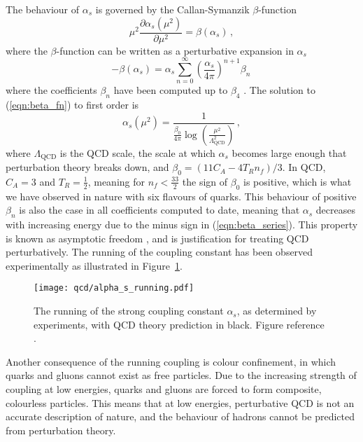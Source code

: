 \documentclass[main.tex]{subfiles}
\begin{document}
    The behaviour of $\alpha_{s}$
    is governed by the Callan-Symanzik \cite{Callan:1970yg,Symanzik:1970rt}
    $\beta$-function
    \begin{equation}\label{eqn:beta_fn}
        \mu^{2} \dfrac{\partial \alpha_{s}(\mu^{2})}{\partial \mu^{2}} = \beta(\alpha_{s}) \, ,
    \end{equation}
    where the $\beta$-function can be written as a perturbative
    expansion in $\alpha_{s}$
    \begin{equation}\label{eqn:beta_series}
        -\beta(\alpha_{s}) = \alpha_{s}\sum_{n=0}^{\infty}\left(\dfrac{\alpha_{s}}{4\pi}\right)^{n+1} \beta_{n}\, 
    \end{equation}
    where the coefficients $\beta_{n}$ have been computed
    up to $\beta_{4}$ \cite{Baikov:2016tgj,Luthe:2017ttg}.
    The solution to (\ref{eqn:beta_fn}) to first order
    is
    \begin{equation}\label{eqn:1l_alpha}
        \alpha_{s}(\mu^{2}) = \dfrac{1}{\frac{\beta_{0}}{4\pi}\log\left(\frac{\mu^{2}}{\Lambda_{\mathrm{QCD}}^{2}}\right)} \, ,
    \end{equation}
    where $\Lambda_{\mathrm{QCD}}$ is the QCD scale,
    the scale at which $\alpha_{s}$ becomes
    large enough that perturbation theory breaks down,
    and $\beta_{0} = (11C_{A} - 4T_{R}n_{f})/3$.
    In QCD, $C_{A}=3$ and $T_{R}=\frac{1}{2}$, meaning for
    $n_{f} < \frac{33}{2}$ the sign of $\beta_{0}$ is positive,
    which is what we have observed in nature with six
    flavours of quarks. This behaviour of positive
    $\beta_{n}$ is also the case in all coefficients
    computed to date, meaning that $\alpha_{s}$
    decreases with increasing energy due to the minus sign
    in (\ref{eqn:beta_series}). This property is known as
    asymptotic freedom \cite{Gross:1973id,Politzer:1973fx},
    and is justification for treating QCD perturbatively.
    The running of the coupling constant has been
    observed experimentally as illustrated in Figure~\ref{fig:alpha_s_running}.
    \begin{figure}
        \texttt{[image: qcd/alpha\_s\_running.pdf]}
        \caption{The running of the strong coupling constant $\alpha_{s}$,
        as determined by experiments, with QCD theory prediction in black.
        Figure reference \cite{Workman:2022ynf}.}
        \label{fig:alpha_s_running}
    \end{figure}

    Another consequence of the running coupling
    is colour confinement, in which quarks and
    gluons cannot exist as free particles. Due
    to the increasing strength of coupling at low
    energies, quarks and gluons are forced to
    form composite, colourless particles. This means
    that at low energies, perturbative QCD
    is not an accurate description of nature,
    and the behaviour of hadrons cannot be predicted
    from perturbation theory.
    
\end{document}
